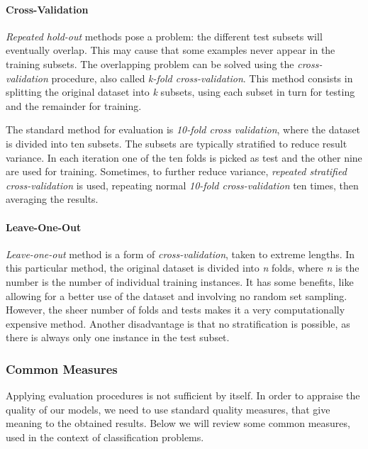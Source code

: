\paragraph{Cross-Validation}

\textit{Repeated hold-out} methods pose a problem: the different test subsets
will eventually overlap. This may cause that some examples never appear in the
training subsets. The overlapping problem can be solved using the
\textit{cross-validation} procedure, also called \textit{k-fold
cross-validation}. This method consists in splitting the original dataset into
\textit{k} subsets, using each subset in turn for testing and the remainder for
training.

The standard method for evaluation is \textit{10-fold cross validation}, where
the dataset is divided into ten subsets. The subsets are typically stratified to
reduce result variance. In each iteration one of the ten folds is picked as test
and the other nine are used for training. Sometimes, to further reduce variance,
\textit{repeated stratified cross-validation} is used, repeating normal
\textit{10-fold cross-validation} ten times, then averaging the results.

\paragraph{Leave-One-Out}

\textit{Leave-one-out} method is a form of \textit{cross-validation}, taken to
extreme lengths. In this particular method, the original dataset is divided into
\textit{n} folds, where \textit{n} is the number is the number of individual
training instances. It has some benefits, like allowing for a better use of the
dataset and involving no random set sampling. However, the sheer number of folds
and tests makes it a very computationally expensive method. Another disadvantage
is that no stratification is possible, as there is always only one instance in
the test subset.

\subsubsection*{Common Measures}

Applying evaluation procedures is not sufficient by itself. In order to appraise
the quality of our models, we need to use standard quality measures, that give
meaning to the obtained results. Below we will review some common measures, used
in the context of classification problems.

